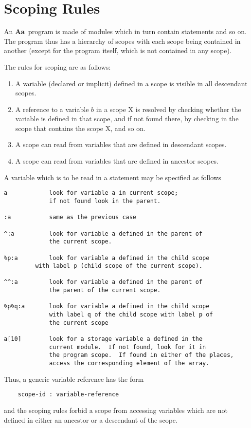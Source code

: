 \documentclass{article}
\newcommand{\Aa}{{\bf Aa}~}
\begin{document}
\section{Scoping Rules}

An \Aa program is made of modules which in turn contain statements
and so on.  The program thus has a hierarchy of scopes with each
scope being contained in another (except for the program itself,
which is not contained in any scope).

The rules for scoping are as follows:
\begin{enumerate}
\item A variable (declared or implicit) defined in a scope is visible
in all descendant scopes.
\item A reference to a variable $b$ in a scope X is resolved by checking
whether the variable is defined in that scope, and if not found there,
by checking in the scope that contains the scope X, and so on.
\item A scope can read from variables that are defined in descendant
scopes.  
\item A scope can read from variables that are defined in ancestor scopes.
\end{enumerate}

A variable which is to be read in a statement may be specified 
as follows
\begin{verbatim}
a            look for variable a in current scope; 
             if not found look in the parent.

:a           same as the previous case

^:a          look for variable a defined in the parent of
             the current scope.

%p:a         look for variable a defined in the child scope 
	     with label p (child scope of the current scope).

^^:a         look for variable a defined in the parent of
             the parent of the current scope.

%p%q:a       look for variable a defined in the child scope 
             with label q of the child scope with label p of 
             the current scope

a[10]        look for a storage variable a defined in the 
             current module.  If not found, look for it in
             the program scope.  If found in either of the places,
             access the corresponding element of the array.
\end{verbatim}
Thus, a generic variable reference has the form 
\begin{verbatim} 
    scope-id : variable-reference 
\end{verbatim} 
and the scoping rules forbid a scope from accessing variables
which are not defined in either an ancestor or a descendant
of the scope.
\end{document}

